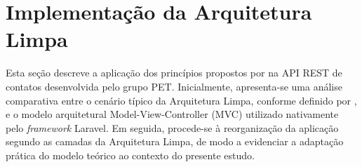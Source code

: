 \section{Implementação da Arquitetura Limpa}

    \par Esta seção descreve a aplicação dos princípios propostos por \cite{livro:martin:cleanarch} na API REST de contatos desenvolvida pelo grupo PET. Inicialmente, apresenta-se uma análise comparativa entre o cenário típico da Arquitetura Limpa, conforme definido por \cite{livro:martin:cleanarch}, e o modelo arquitetural Model-View-Controller (MVC) utilizado nativamente pelo \textit{framework} Laravel. Em seguida, procede-se à reorganização da aplicação segundo as camadas da Arquitetura Limpa, de modo a evidenciar a adaptação prática do modelo teórico ao contexto do presente estudo.

    
    


